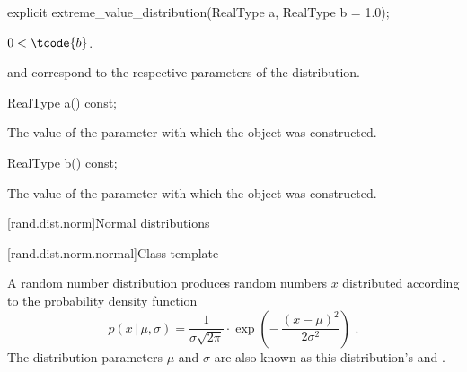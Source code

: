 %
\begin{itemdecl}
explicit extreme_value_distribution(RealType a, RealType b = 1.0);
\end{itemdecl}

\begin{itemdescr}
\pnum
\expects
$0 < \tcode{b}$.

\pnum
\remarks
{} and 
correspond to the respective parameters of the distribution.
\end{itemdescr}

%
\begin{itemdecl}
RealType a() const;
\end{itemdecl}

\begin{itemdescr}
\pnum
\returns
The value of the  parameter
 with which the object was constructed.
\end{itemdescr}

%
\begin{itemdecl}
RealType b() const;
\end{itemdecl}

\begin{itemdescr}
\pnum
\returns
The value of the  parameter
 with which the object was constructed.
\end{itemdescr}%
%



[rand.dist.norm]{Normal distributions}%
%


[rand.dist.norm.normal]{Class template }%
%

\pnum
A  random number distribution
produces random numbers $x$
distributed according to
the probability density function%
\[%
 p(x\,|\,\mu,\sigma)
      = \frac{1}{\sigma \sqrt{2\pi}}
        \cdot
        \exp{\left(- \, \frac{(x - \mu)^2}
                             {2 \sigma^2}
             \right)
            }
 \text{ .}
\]
The distribution parameters $\mu$ and $\sigma$
are also known as this distribution's 
and .

